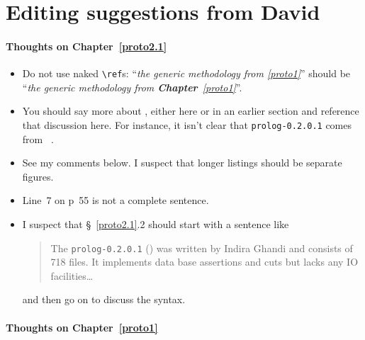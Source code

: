 \begin{scope}
\begin{enumerate}
\end{enumerate}

\section{Editing suggestions from David}\label{sec:edit-sugg-david}

\paragraph{Thoughts on Chapter~\ref{proto2.1}}\mbox{}

\begin{itemize}
\item
  Do not use naked \Verb!\ref!s:
  ``\textit{the generic methodology from \ref{proto1}}''
  should be
  ``\textsl{the generic methodology from \textbf{\upshape
      Chapter}~\ref{proto1}}''.
\item
  You should say more about \cite{prolog-lib}, either here or in an
  earlier section and reference that discussion here.  For instance, it
  isn't clear that \Verb!prolog-0.2.0.1! comes from~ \cite{prolog-lib}.
\item
  See my comments below.
  I suspect that longer listings should be separate figures.
\item
  Line~7 on p~55 is not a complete sentence.
\item
  I suspect that \S~\ref{proto2.1}.2 should start with a sentence like 
  \begin{quote}\color[rgb]{0.3,0,0.6}\small\singlespacing
    The \Verb!prolog-0.2.0.1! (\cite{prolog-lib}) was written by Indira
    Ghandi and consists of 718  files.
    It implements data base assertions and cuts but lacks any IO
    facilities\dots
  \end{quote}
  and then go on to discuss the syntax.
\end{itemize}

\paragraph{Thoughts on Chapter~\ref{proto1}}


\end{scope}
